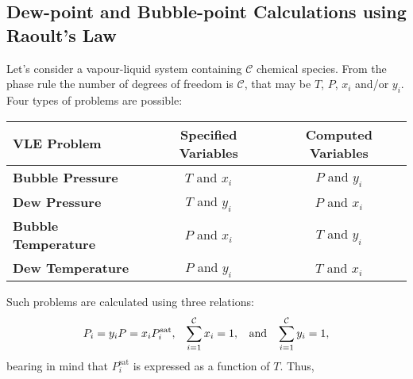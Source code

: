\subsection{Dew-point and Bubble-point Calculations using Raoult’s Law }\label{Chapter:VLE:Section:DewBubblePoint}
Let's consider a vapour-liquid system containing $\mathcal{C}$ chemical species. From the phase rule the number of degrees of freedom is $\mathcal{C}$, that may be $T$, $P$, $x_{i}$ and/or $y_{i}$. Four types of problems are possible:
\begin{center}
   \begin{tabular}{|l c c|}
      \hline 
      $\mathbf{VLE}$ {\bf Problem} & {\bf Specified Variables} &  {\bf Computed Variables} \\  
      \hline
          {\bf Bubble Pressure}        &  $T$ and $x_{i}$           &   $P$ and $y_{i}$          \\
          {\bf Dew Pressure}           &  $T$ and $y_{i}$           &   $P$ and $x_{i}$          \\
          {\bf Bubble Temperature}     &  $P$ and $x_{i}$           &   $T$ and $y_{i}$          \\
          {\bf Dew Temperature}        &  $P$ and $y_{i}$           &   $T$ and $x_{i}$          \\     
      \hline
   \end{tabular}
\end{center}
Such problems are calculated using three relations:
\begin{displaymath}
    P_{i} = y_{i}P = x_{i}P_{i}^{\text{sat}}, \;\;\; \summation[x_{i}]{i=1}{\mathcal{C}} = 1, \;\;\text{ and }\;\; \summation[y_{i}]{i=1}{\mathcal{C}} = 1,
\end{displaymath}
bearing in mind that $P_{i}^{\text{sat}}$ is expressed as a function of $T$. Thus,
